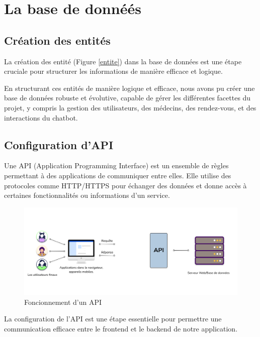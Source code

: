 \section{La base de donnéés}


\subsection{Création des entités}

\hspace{16pt}La création des entité (Figure \ref{entite}) dans la base de données est une étape cruciale pour structurer les informations de manière efficace et logique.

En structurant ces entités de manière logique et efficace, nous avons pu créer une base de données robuste et évolutive, capable de gérer les différentes facettes du projet, y compris la gestion des utilisateurs, des médecins, des rendez-vous, et des interactions du chatbot.

\subsection{Configuration d'API}

\hspace{16pt}Une API (Application Programming Interface) est un ensemble de règles permettant à des applications de communiquer entre elles. Elle utilise des protocoles comme HTTP/HTTPS pour échanger des données et donne accès à certaines fonctionnalités ou informations d'un service.

\begin{figure}[H] 
    \centering
    \includegraphics[scale=0.49]{Figures/API.png}
    \caption{Foncionnement d'un API}
\end{figure}

La configuration de l'API est une étape essentielle pour permettre une communication efficace entre le frontend et le backend de notre application.

